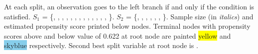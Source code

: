 \documentclass{article}
\begin{document}
At each split, an observation goes to the left branch 
 if and only if the condition is satisfied.
 $S_{1}$ = \{\texttt{}, \texttt{},
 \texttt{}, \texttt{}, \texttt{},
 \texttt{}, \texttt{}, \texttt{},
 \texttt{}, \texttt{}, \texttt{},
 \texttt{}, \texttt{}, \texttt{}\}.
 $S_{2}$ = \{\texttt{}, \texttt{},
 \texttt{}, \texttt{}, \texttt{},
 \texttt{}, \texttt{}\}.
Sample size (in \emph{italics}) and estimated propensity score printed below nodes.
 Terminal nodes with propensity scores above and below value of  0.622  at root node are painted \colorbox{yellow}{yellow} and \colorbox{skyblue}{skyblue} respectively.
 Second best split variable at root node is \texttt{}.
 
\end{document}
